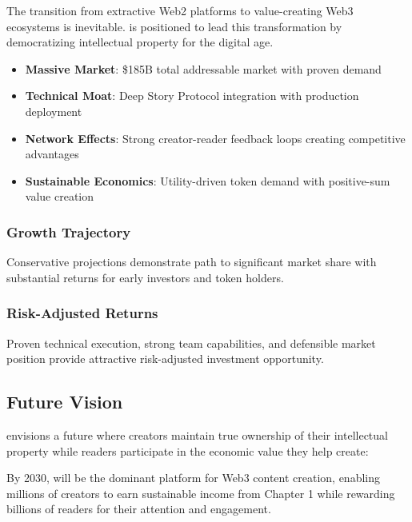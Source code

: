 \begin{keypoint}
The transition from extractive Web2 platforms to value-creating Web3 ecosystems is inevitable. \storyhouse{} is positioned to lead this transformation by democratizing intellectual property for the digital age.
\end{keypoint}

\begin{itemize}
    \item \textbf{Massive Market}: \$185B total addressable market with proven demand
    \item \textbf{Technical Moat}: Deep Story Protocol integration with production deployment
    \item \textbf{Network Effects}: Strong creator-reader feedback loops creating competitive advantages
    \item \textbf{Sustainable Economics}: Utility-driven token demand with positive-sum value creation
\end{itemize}

\subsubsection{Growth Trajectory}

Conservative projections demonstrate path to significant market share with substantial returns for early investors and token holders.

\subsubsection{Risk-Adjusted Returns}

Proven technical execution, strong team capabilities, and defensible market position provide attractive risk-adjusted investment opportunity.

\subsection{Future Vision}

\storyhouse{} envisions a future where creators maintain true ownership of their intellectual property while readers participate in the economic value they help create:

\begin{innovation}
By 2030, \storyhouse{} will be the dominant platform for Web3 content creation, enabling millions of creators to earn sustainable income from Chapter 1 while rewarding billions of readers for their attention and engagement.
\end{innovation}

